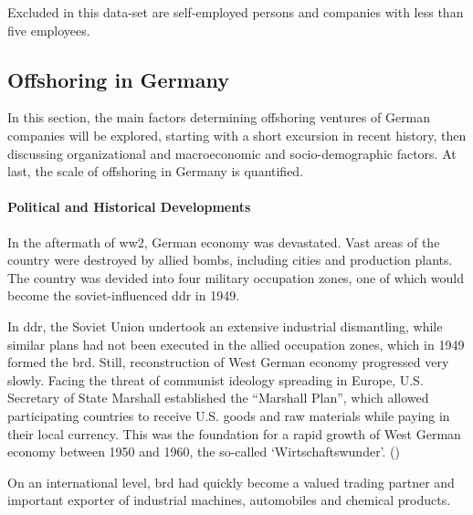 
Excluded in this data-set are self-employed persons and companies with less than five employees.

\subsection{Offshoring in Germany}
\label{sec:OffshoringGER}
In this section, the main factors determining offshoring ventures of German companies will be explored, starting with a short excursion in recent history, then discussing organizational and macroeconomic and socio-demographic factors. At last, the scale of offshoring in Germany is quantified.

\paragraph{Political and Historical Developments}
In the aftermath of \gls{ww2}, German economy was devastated. Vast areas of the country were destroyed by allied bombs, including cities and production plants. The country was devided into four military occupation zones, one of which would become the soviet-influenced \gls{ddr} in 1949.

In \gls{ddr}, the Soviet Union undertook an extensive industrial dismantling, while similar plans had not been executed in the allied occupation zones, which in 1949 formed the \gls{brd}. Still, reconstruction of West German economy progressed very slowly. Facing the threat of communist ideology spreading in Europe, U.S. Secretary of State Marshall established the ``Marshall Plan'', which allowed participating countries to receive U.S. goods and raw materials while paying in their local currency. This was the foundation for a rapid growth of West German economy between 1950 and 1960, the so-called `Wirtschaftswunder'. (\cite{Kimmel.2005})

On an international level, \gls{brd} had quickly become a valued trading partner and important exporter of industrial machines, automobiles and chemical products. %


